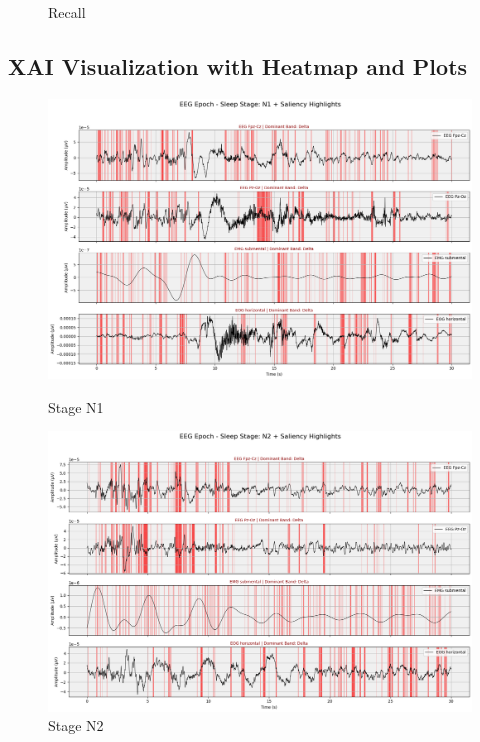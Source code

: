 \begin{figure}[htbp]
\begin{minipage}[b]{0.31\linewidth}
		\caption{Recall}
		\label{fig:recallplot}
	\end{minipage}
\end{figure}




\subsection{XAI Visualization with Heatmap and Plots}

\begin{figure}[H]
	\centering
	\begin{minipage}[b]{0.45\linewidth}
		\includegraphics[width=\linewidth]{"img/paper_3/stage n1"}
		\caption{Stage N1}
		\label{fig:stage-n1}
	\end{minipage}
	\hfill
	\begin{minipage}[b]{0.45\linewidth}
		\includegraphics[width=\linewidth]{"img/paper_3/stage n2"}
		\caption{Stage N2}
		\label{fig:stage-n2}
	\end{minipage}
\end{figure}

